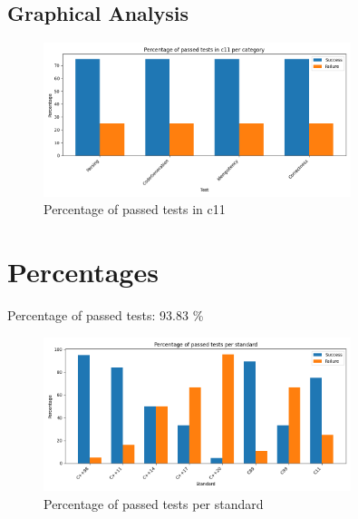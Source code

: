 \documentclass{article}
\begin{document}
\subsection{Graphical Analysis}
\begin{figure}[h!]
\centering
\includegraphics[width=0.8\textwidth]{../reports/clava/images/c11_percentage.png}
\caption{Percentage of passed tests in c11}
\label{fig:c11_percentage}
\end{figure}
\newpage
\section{Percentages}Percentage of passed tests:
93.83 \%\begin{figure}[h!]
\centering
\includegraphics[width=0.8\textwidth]{../reports/clava/images/global_percentage.png}
\caption{Percentage of passed tests per standard}
\label{fig:global_percentage}
\end{figure}
\end{document}

